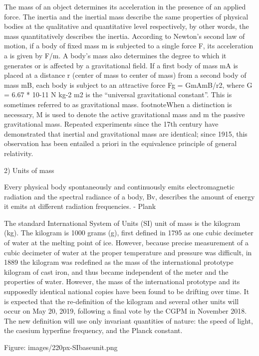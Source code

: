 \documentclass{book}
\begin{document}
    
    The mass of an object determines its acceleration in the presence of an applied force. The inertia and the inertial mass describe the same properties of physical bodies at the qualitative and quantitative level respectively, by other words, the mass quantitatively describes the inertia. According to Newton's second law of motion, if a body of fixed mass m is subjected to a single force F, its acceleration a is given by F/m. A body's mass also determines the degree to which it generates or is affected by a gravitational field. If a first body of mass mA is placed at a distance r (center of mass to center of mass) from a second body of mass mB, each body is subject to an attractive force Fg = GmAmB/r2, where G = 6.67 * 10{-11} N kg{-2} m2 is the ``universal gravitational constant''. This is sometimes referred to as gravitational mass.  footnote{When a distinction is necessary, M is used to denote the active gravitational mass and m the passive gravitational mass.} Repeated experiments since the 17th century have demonstrated that inertial and gravitational mass are identical; since 1915, this observation has been entailed a priori in the equivalence principle of general relativity.
    
    2) Units of mass

    Every physical body spontaneously and continuously emits electromagnetic radiation and the spectral radiance of a body, Bv, describes the amount of energy it emits at different radiation frequencies. - Plank
    
    The standard International System of Units (SI) unit of mass is the kilogram (kg). The kilogram is 1000 grams (g), first defined in 1795 as one cubic decimeter of water at the melting point of ice. However, because precise measurement of a cubic decimeter of water at the proper temperature and pressure was difficult, in 1889 the kilogram was redefined as the mass of the international prototype kilogram of cast iron, and thus became independent of the meter and the properties of water. However, the mass of the international prototype and its supposedly identical national copies have been found to be drifting over time. It is expected that the re-definition of the kilogram and several other units will occur on May 20, 2019, following a final vote by the CGPM in November 2018. The new definition will use only invariant quantities of nature: the speed of light, the caesium hyperfine frequency, and the Planck constant.
    
    Figure: images/220px-SIbaseunit.png
    
\end{document}
